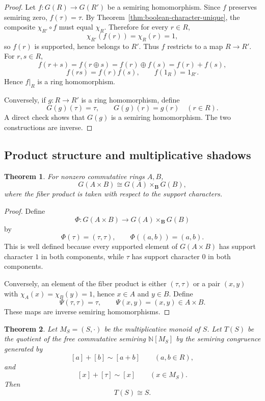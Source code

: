 \documentclass[11pt]{amsart}
\numberwithin{equation}{section}
\newtheorem{theorem}{Theorem}[section]
\theoremstyle{definition}
\newcommand{\B}{\mathbf B}
\begin{document}
\begin{proof}
Let $f:G(R)\to G(R')$ be a semiring homomorphism. Since $f$ preserves semiring zero, $f(\tau)=\tau$. By Theorem~\ref{thm:boolean-character-unique}, the composite $\chi_{R'}\circ f$ must equal $\chi_R$. Therefore for every $r\in R$,
\[
\chi_{R'}(f(r))=\chi_R(r)=1,
\]
so $f(r)$ is supported, hence belongs to $R'$. Thus $f$ restricts to a map $R\to R'$. For $r,s\in R$,
\[
f(r+s)=f(r\oplus s)=f(r)\oplus f(s)=f(r)+f(s),
\]
\[
f(rs)=f(r)f(s),
\qquad
f(1_R)=1_{R'}.
\]
Hence $f|_R$ is a ring homomorphism.

Conversely, if $g:R\to R'$ is a ring homomorphism, define
\[
G(g)(\tau)=\tau,
\qquad
G(g)(r)=g(r)
\quad(r\in R).
\]
A direct check shows that $G(g)$ is a semiring homomorphism. The two constructions are inverse. 
\end{proof}

\subsection{Product structure and multiplicative shadows}

\begin{theorem}\label{thm:product-fiber}
For nonzero commutative rings $A,B$,
\[
G(A\times B)\cong G(A)\times_{\B}G(B),
\]
where the fiber product is taken with respect to the support characters.
\end{theorem}

\begin{proof}
Define
\[
\Phi:G(A\times B)\to G(A)\times_{\B}G(B)
\]
by
\[
\Phi(\tau)=(\tau,\tau),
\qquad
\Phi((a,b))=(a,b).
\]
This is well defined because every supported element of $G(A\times B)$ has support character $1$ in both components, while $\tau$ has support character $0$ in both components.

Conversely, an element of the fiber product is either $(\tau,\tau)$ or a pair $(x,y)$ with $\chi_A(x)=\chi_B(y)=1$, hence $x\in A$ and $y\in B$. Define
\[
\Psi(\tau,\tau)=\tau,
\qquad
\Psi(x,y)=(x,y)\in A\times B.
\]
These maps are inverse semiring homomorphisms. 
\end{proof}

\begin{theorem}\label{thm:monoid-reconstruction}
Let $M_S=(S,\cdot)$ be the multiplicative monoid of $S$. Let $T(S)$ be the quotient of the free commutative semiring $\mathbb N[M_S]$ by the semiring congruence generated by
\[
[a]+[b]\sim [a+b]
\qquad (a,b\in R),
\]
and
\[
[x]+[\tau]\sim [x]
\qquad (x\in M_S).
\]
Then
\[
T(S)\cong S.
\]
\end{theorem}
\end{document}
